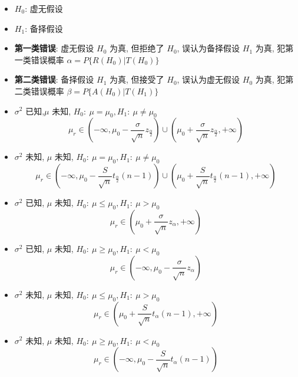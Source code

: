 \begin{definition}[统计性检验]
	\begin{itemize}
		\item $H_{0}$: 虚无假设
		\item $H_{1}$: 备择假设
	\end{itemize}
\end{definition}
\begin{definition}[两类错误]
	\begin{itemize}
		\item \textbf{第一类错误}: 虚无假设 $H_{0}$ 为真, 但拒绝了 $H_{0}$, 误认为备择假设 $H_{1}$ 为真, 犯第一类错误概率 $\alpha = P\{R(H_{0})\big| T(H_{0})\}$
		\item \textbf{第二类错误}: 备择假设 $H_{1}$ 为真, 但接受了 $H_{0}$, 误认为虚无假设 $H_{0}$ 为真, 犯第二类错误概率 $\beta = P\{A(H_{0})\big| T(H_{1})\}$
	\end{itemize}
\end{definition}
\begin{corollary}[正态总体下的六大检查和拒绝域]
	\begin{itemize}
		\item $\sigma^{2}$ 已知,$\mu$ 未知, $H_{0}:\ \mu = \mu_{0}, H_{1}:\ \mu \neq \mu_{0}$
		$$\mu_{r}\in (-\infty,\mu_{0}-\frac{\sigma}{\sqrt{n}}z_{\frac{\alpha}{2}})\cup (\mu_{0}+\frac{\sigma}{\sqrt{n}}z_{\frac{\alpha}{2}},+\infty)$$
		
		\item $\sigma^{2}$ 未知, $\mu$ 未知, $H_{0}:\ \mu = \mu_{0}, H_{1}:\ \mu\neq \mu_{0}$
		$$\mu_{r}\in (-\infty,\mu_{0}-\frac{S}{\sqrt{n}}t_{\frac{\alpha}{2}}(n-1))\cup (\mu_{0}+\frac{S}{\sqrt{n}}t_{\frac{\alpha}{2}}(n-1),+\infty)$$
		
		\item $\sigma^{2}$ 已知, $\mu$ 未知, $H_{0}:\ \mu\leq \mu_{0}, H_{1}:\ \mu > \mu_{0}$
		$$\mu_{r}\in (\mu_{0} + \frac{\sigma}{\sqrt{n}}z_{\alpha},+\infty)$$

		\item $\sigma^{2}$ 已知, $\mu$ 未知, $H_{0}:\ \mu\geq \mu_{0}, H_{1}:\ \mu < \mu_{0}$
		$$\mu_{r}\in (-\infty,\mu_{0}-\frac{\sigma}{\sqrt{n}}z_{\alpha})$$

		\item $\sigma^{2}$ 未知, $\mu$ 未知, $H_{0}:\ \mu\leq \mu_{0}, H_{1}:\ \mu> \mu_{0}$
		$$\mu_{r}\in (\mu_{0} + \frac{S}{\sqrt{n}}t_{\alpha}(n-1),+\infty)$$

		\item $\sigma^{2}$ 未知, $\mu$ 未知, $H_{0}:\ \mu\geq \mu_{0}, H_{1}:\ \mu< \mu_{0}$
		$$\mu_{r}\in (-\infty,\mu_{0}-\frac{S}{\sqrt{n}}t_{\alpha}(n-1))$$
	\end{itemize}
\end{corollary}
